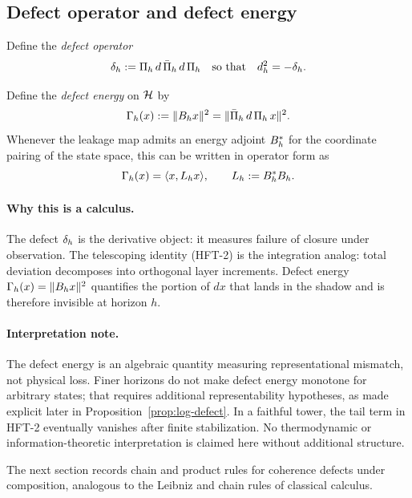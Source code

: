 \subsection{Defect operator and defect energy}

\begin{definition}\label{def:defect-operator}
Define the \emph{defect operator}
\[
\CCDefect{d}{h} := \CCDefectExpr{d}{h}
\quad\text{so that}\quad
\CCObs{d}{h}^2 = -\CCDefect{d}{h}.
\]
\end{definition}

\begin{definition}\label{def:defect-energy-operator}
Define the \emph{defect energy} on $\cH$ by
\[
\CCDefEnergy{h}{x} := \|\CCLeak{d}{h} x\|^2 = \|\CCLeakExpr{d}{h}\, x\|^2.
\]
Whenever the leakage map admits an energy adjoint $\CCLeak{d}{h}^\ast$ for the coordinate pairing of the state space, this can be written in operator form as
\[
\CCDefEnergy{h}{x} = \langle x, \CCDefOp{d}{h} x\rangle,
\qquad
\CCDefOp{d}{h} := \CCLeak{d}{h}^\ast \CCLeak{d}{h}.
\]
\end{definition}

\paragraph{Why this is a calculus.}
The defect $\CCDefect{d}{h}$ is the derivative object: it measures failure of
closure under observation. The telescoping identity (HFT-2) is the integration
analog: total deviation decomposes into orthogonal layer increments. Defect
energy $\CCDefEnergy{h}{x} = \|\CCLeak{d}{h} x\|^2$ quantifies the portion of
$dx$ that lands in the shadow and is therefore invisible at horizon $h$.

\paragraph{Interpretation note.}
\label{rem:interpretation-note}
The defect energy is an algebraic quantity measuring representational mismatch,
not physical loss. Finer horizons do not make defect energy monotone for
arbitrary states; that requires additional representability hypotheses, as made
explicit later in Proposition~\ref{prop:log-defect}. In a faithful tower, the
tail term in HFT-2 eventually vanishes after finite stabilization. No
thermodynamic or information-theoretic interpretation is claimed here without
additional structure.

The next section records chain and product rules for coherence defects under composition, analogous to the Leibniz and chain rules of classical calculus.
